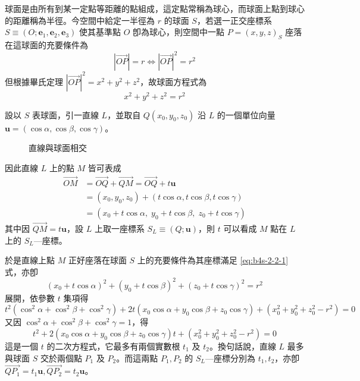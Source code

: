 球面是由所有到某一定點等距離的點組成，這定點常稱為球心，而球面上點到球心的距離稱為半徑。今空間中給定一半徑為 $r$ 的球面 $S$，若選一正交座標系 $S \equiv (O; \mathbf{e}_1, \mathbf{e}_2, \mathbf{e}_3)$ 使其基準點 $O$ 卽為球心，則空間中一點 $P = (x, y, z)_S$ 座落在這球面的充要條件為
\[ |\vec{OP}| = r \iff |\vec{OP}|^2 = r^2 \]
但根據畢氏定理 $|\vec{OP}|^2 = x^2 + y^2 + z^2$，故球面方程式為
\begin{equation}
x^2 + y^2 + z^2 = r^2 \label{eq:b4s-2-2-1}
\end{equation}

設以 $S$ 表球面，引一直線 $L$，並取自 $Q(x_0, y_0, z_0)$ 沿 $L$ 的一個單位向量 $\mathbf{u} = (\cos\alpha, \cos\beta, \cos\gamma)$。

\begin{figure}[H]
\centering
{}
\caption{直線與球面相交}
\label{fig:b4s-2-2-2}
\end{figure}

因此直線 $L$ 上的點 $M$ 皆可表成
\begin{align*}
\vec{OM} &= \vec{OQ} + \vec{QM} = \vec{OQ} + t\mathbf{u} \\
&= (x_0, y_0, z_0) + (t\cos\alpha, t\cos\beta, t\cos\gamma) \\
&= (x_0 + t\cos\alpha, \; y_0 + t\cos\beta, \; z_0 + t\cos\gamma)
\end{align*}
其中因 $\vec{QM} = t\mathbf{u}$，設 $L$ 上取一座標系 $S_L \equiv (Q; \mathbf{u})$，則 $t$ 可以看成 $M$ 點在 $L$ 上的 $S_L$---座標。

於是直線上點 $M$ 正好座落在球面 $S$ 上的充要條件為其座標滿足 \eqref{eq:b4s-2-2-1} 式，亦卽
\[ (x_0 + t\cos\alpha)^2 + (y_0 + t\cos\beta)^2 + (z_0 + t\cos\gamma)^2 = r^2 \]
展開，依參數 $t$ 集項得
\[ t^2(\cos^2\alpha + \cos^2\beta + \cos^2\gamma) + 2t(x_0\cos\alpha + y_0\cos\beta + z_0\cos\gamma) + (x_0^2 + y_0^2 + z_0^2 - r^2) = 0 \]
又因 $\cos^2\alpha + \cos^2\beta + \cos^2\gamma = 1$，得
\begin{equation}
t^2 + 2(x_0\cos\alpha + y_0\cos\beta + z_0\cos\gamma)t + (x_0^2 + y_0^2 + z_0^2 - r^2) = 0 \label{eq:b4s-2-2-2}
\end{equation}
這是一個 $t$ 的二次方程式，它最多有兩個實數根 $t_1$ 及 $t_2$。換句話說，直線 $L$ 最多與球面 $S$ 交於兩個點 $P_1$ 及 $P_2$。而這兩點 $P_1, P_2$ 的 $S_L$---座標分別為 $t_1, t_2$，亦卽 $\vec{QP_1} = t_1\mathbf{u}, \vec{QP_2} = t_2\mathbf{u}$。

